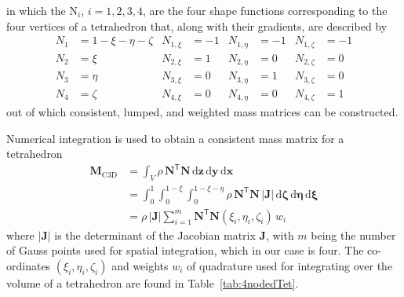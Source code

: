 in which the $\mathrm{N}_i$, $i = 1, 2, 3, 4$, are the four shape functions corresponding to the four vertices of a tetrahedron that, along with their gradients, are described by
\begin{subequations}
    \label{tetShapeFunctions}
    \begin{align}
    N_1 & = 1 - \xi - \eta - \zeta & N_{1,\xi} & = -1 &
    N_{1,\eta} & = -1 & N_{1,\zeta} & = -1 \\
    N_2 & = \xi & N_{2,\xi} & = 1 & N_{2,\eta} & = 0 & N_{2,\zeta} & = 0 \\
    N_3 & = \eta & N_{3,\xi} & = 0 & N_{3,\eta} & = 1 & N_{3,\zeta} & = 0 \\
    N_4 & = \zeta & N_{4,\xi} & = 0 & N_{4,\eta} & = 0 & N_{4,\zeta} & = 1 
    \end{align}
\end{subequations}
out of which consistent, lumped, and weighted mass matrices can be constructed.

Numerical integration is used to obtain a consistent mass matrix for a tetrahedron
\begin{equation}
\begin{aligned}
\mathbf{M}_{\mathrm{C3D}} & = \int_V \rho \, \mathbf{N}^{\mathsf{T}} \mathbf{N} \, \mathrm{d} \mathbf{z} \, \mathrm{d} \mathbf{y} \, \mathrm{d} \mathbf{x} \\ & = \int_0^1 \int_0^{1-\xi} \int_0^{1-\xi-\eta} \rho \, \mathbf{N}^{\mathsf{T}} \mathbf{N} \, | \mathbf{J} | \, \mathrm{d} \mathbf{\zeta} \, \mathrm{d} \mathbf{\eta} \, \mathrm{d} \mathbf{\xi} \\ & = \rho \, |\mathbf{J} | \sum_{i=1}^m \mathbf{N}^{\mathsf{T}} \mathbf{N} (\xi_i , \eta_i , \zeta_i ) \, w_i
\end{aligned}
\label{consMass3D}
\end{equation}
where $|\mathbf{J}|$ is the determinant of the Jacobian matrix $\mathbf{J}$, with $m$ being the number of Gauss points used for spatial integration, which in our case is four.  The co-ordinates $( \xi_i , \eta_i , \zeta_i )$ and weights $w_i$ of quadrature used for integrating over the volume of a tetrahedron are found in Table~\ref{tab:4nodedTet}.

